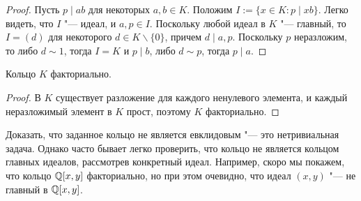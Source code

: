 \begin{proof}
	Пусть $p \mid ab$ для некоторых $a, b \in K$. Положим $I := \{x \in K: p \mid xb\}$. Легко видеть, что $I$ "--- идеал, и $a, p \in I$. Поскольку любой идеал в $K$ "--- главный, то $I = (d)$ для некоторого $d \in K \backslash \{0\}$, причем $d \mid a, p$. Поскольку $p$ неразложим, то либо $d \sim 1$, тогда $I = K$ и $p \mid b$, либо $d \sim p$, тогда $p \mid a$.
\end{proof}

\begin{theorem}
	Кольцо $K$ факториально.
\end{theorem}

\begin{proof}
	В $K$ существует разложение для каждого ненулевого элемента, и каждый неразложимый элемент в $K$ прост, поэтому $K$ факториально.
\end{proof}

\begin{note}
	Доказать, что заданное кольцо не является евклидовым "--- это нетривиальная задача. Однако часто бывает легко проверить, что кольцо не является кольцом главных идеалов, рассмотрев конкретный идеал. Например, скоро мы покажем, что кольцо $\mathbb{Q}[x, y]$ факториально, но при этом очевидно, что идеал $(x, y)$ "--- не главный в $\mathbb{Q}[x, y]$.
\end{note}